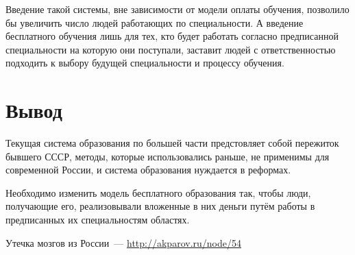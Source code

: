 \documentclass[10pt,a4paper,titlepage]{article}
\begin{document}
Введение такой системы, вне зависимости от модели оплаты обучения, позволило бы увеличить число людей работающих по специальности.
А введение бесплатного обучения лишь для тех, кто будет работать согласно предписанной специальности на которую они поступали,
заставит людей с ответственностью подходить к выбору будущей специальности и процессу обучения.

\section*{Вывод}
Текущая система образования по большей части предстовляет собой пережиток бывшего СССР, 
методы, которые использовались раньше, не применимы для современной России, 
и система образования нуждается в реформах.

Необходимо изменить модель бесплатного образования так, чтобы люди, получающие его, 
реализовывали вложенные в них деньги путём работы в предписанных их специальностям областях.

\pagebreak
\begin{thebibliography}{99}
    Утечка мозгов из России~--- \url{http://akparov.ru/node/54}
\end{thebibliography}
\end{document}
